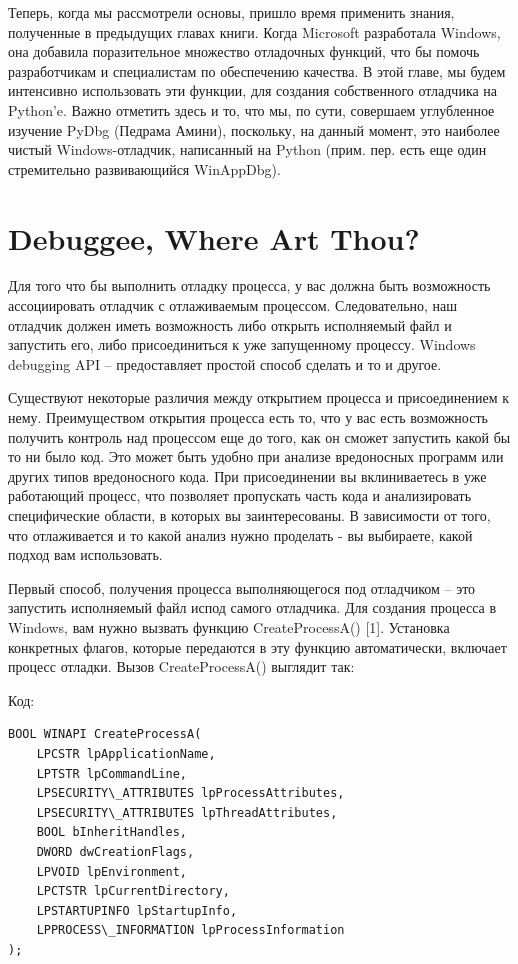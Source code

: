 \documentclass[12pt, a4paper, oneside]{book}
\begin{document}
Теперь, когда мы рассмотрели основы, пришло время применить знания, полученные в предыдущих главах книги. Когда Microsoft разработала Windows, она добавила поразительное множество отладочных функций, что бы помочь разработчикам и специалистам по обеспечению качества. В этой главе, мы будем интенсивно использовать эти функции, для создания собственного отладчика на Python’e. Важно отметить здесь и то, что мы, по сути, совершаем углубленное изучение PyDbg (Педрама Амини), поскольку, на данный момент, это наиболее чистый Windows-отладчик, написанный на Python (прим. пер. есть еще один стремительно развивающийся WinAppDbg). 


\section{Debuggee, Where Art Thou?}

Для того что бы выполнить отладку процесса, у вас должна быть возможность ассоциировать отладчик с отлаживаемым процессом. Следовательно, наш отладчик должен иметь возможность либо открыть исполняемый файл и запустить его, либо присоединиться к уже запущенному процессу. Windows debugging API – предоставляет простой способ сделать и то и другое.

Существуют некоторые различия между открытием процесса и присоединением к нему. Преимуществом открытия процесса есть то, что у вас есть возможность получить контроль над процессом еще до того, как он сможет запустить какой бы то ни было код. Это может быть удобно при анализе вредоносных программ или других типов вредоносного кода. При присоединении вы вклиниваетесь в уже работающий процесс, что позволяет пропускать часть кода и анализировать специфические области, в которых вы заинтересованы. В зависимости от того, что отлаживается и то какой анализ нужно проделать - вы выбираете, какой подход вам использовать.

Первый способ, получения процесса выполняющегося под отладчиком – это запустить исполняемый файл испод самого отладчика. Для создания процесса в Windows, вам нужно вызвать функцию CreateProcessA() [1]. Установка конкретных флагов, которые передаются в эту функцию автоматически, включает процесс отладки. Вызов CreateProcessA() выглядит так:

Код:
\begin{verbatim}
BOOL WINAPI CreateProcessA(
    LPCSTR lpApplicationName,
    LPTSTR lpCommandLine,
    LPSECURITY\_ATTRIBUTES lpProcessAttributes,
    LPSECURITY\_ATTRIBUTES lpThreadAttributes,
    BOOL bInheritHandles,
    DWORD dwCreationFlags,
    LPVOID lpEnvironment,
    LPCTSTR lpCurrentDirectory,
    LPSTARTUPINFO lpStartupInfo,
    LPPROCESS\_INFORMATION lpProcessInformation
);
\end{verbatim}
\end{document}
